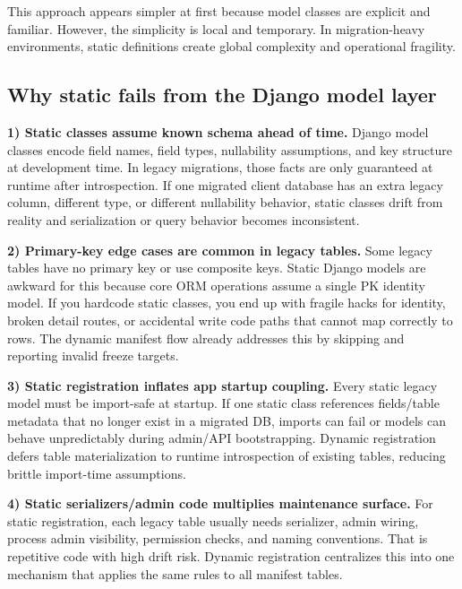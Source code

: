 \documentclass[11pt,a4paper]{article}
\begin{document}
This approach appears simpler at first because model classes are explicit and familiar.
However, the simplicity is local and temporary. In migration-heavy environments, static
definitions create global complexity and operational fragility.

\subsection*{Why static fails from the Django model layer}
\textbf{1) Static classes assume known schema ahead of time.}
Django model classes encode field names, field types, nullability assumptions, and key
structure at development time. In legacy migrations, those facts are only guaranteed at
runtime after introspection. If one migrated client database has an extra legacy column,
different type, or different nullability behavior, static classes drift from reality and
serialization or query behavior becomes inconsistent.

\textbf{2) Primary-key edge cases are common in legacy tables.}
Some legacy tables have no primary key or use composite keys. Static Django models are
awkward for this because core ORM operations assume a single PK identity model. If you
hardcode static classes, you end up with fragile hacks for identity, broken detail routes,
or accidental write code paths that cannot map correctly to rows. The dynamic manifest flow
already addresses this by skipping and reporting invalid freeze targets.

\textbf{3) Static registration inflates app startup coupling.}
Every static legacy model must be import-safe at startup. If one static class references
fields/table metadata that no longer exist in a migrated DB, imports can fail or models can
behave unpredictably during admin/API bootstrapping. Dynamic registration defers table
materialization to runtime introspection of existing tables, reducing brittle import-time
assumptions.

\textbf{4) Static serializers/admin code multiplies maintenance surface.}
For static registration, each legacy table usually needs serializer, admin wiring, process
admin visibility, permission checks, and naming conventions. That is repetitive code with
high drift risk. Dynamic registration centralizes this into one mechanism that applies the
same rules to all manifest tables.
\end{document}
